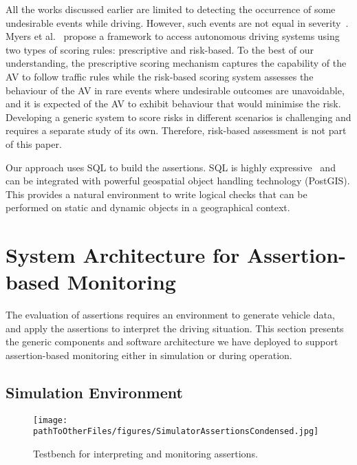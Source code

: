 All the works discussed earlier are limited to detecting the occurrence of some undesirable events while driving. However, such events are not equal in severity~\cite{sinha}. Myers et al.~\cite{myers} propose a framework to access autonomous driving systems using two types of scoring rules: prescriptive and risk-based. To the best of our understanding, the prescriptive scoring mechanism captures the capability of the AV to follow traffic rules while the risk-based scoring system assesses the behaviour of the AV in rare events where undesirable outcomes are unavoidable, and it is expected of the AV to exhibit behaviour that would minimise the risk. Developing a generic system to score risks in different scenarios is challenging and requires a separate study of its own. Therefore, risk-based assessment is not part of this paper.

Our approach uses SQL to build the assertions. SQL is highly expressive~\cite{sqllibkin} and can be integrated with powerful geospatial object handling technology (PostGIS). This provides a natural environment to write logical checks that can be performed on static and dynamic objects in a geographical context. 
%



\section{System Architecture for Assertion-based Monitoring} \label{generic_architecture}

The evaluation of assertions requires an environment to generate vehicle data, and apply the assertions to interpret the driving situation. This section presents the generic components and software architecture we have deployed to support assertion-based monitoring either in simulation or during operation.

\subsection{Simulation Environment} \label{generic_sim_system}

\begin{figure}
    \centering
    \texttt{[image: \\pathToOtherFiles/figures/SimulatorAssertionsCondensed.jpg]}
    \caption{Testbench for interpreting and monitoring assertions.}
    \label{fig:SimulatorArchitecture}
\end{figure}



